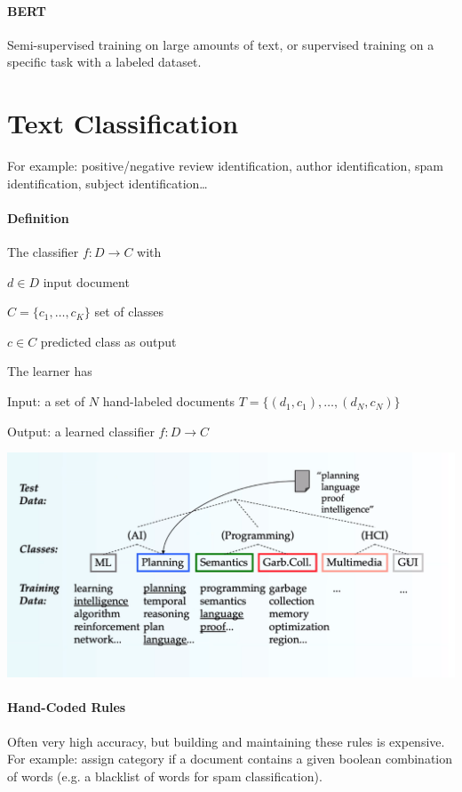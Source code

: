 \documentclass[10pt]{report}
\begin{document}
\paragraph{BERT} Semi-supervised training on large amounts of text, or supervised training on a specific task with a labeled dataset.
\section{Text Classification}
For example: positive/negative review identification, author identification, spam identification, subject identification\ldots
\paragraph{Definition} The classifier $f : D \rightarrow C$ with
\begin{list}{}{}
	\item $d\in D$ input document
	\item $C=\{c_1,\ldots,c_K\}$ set of classes
	\item $c\in C$ predicted class as output
\end{list}
The learner has
\begin{list}{}{}
	\item Input: a set of $N$ hand-labeled documents $T=\{(d_1,c_1),\ldots,(d_N,c_N)\}$
	\item Output: a learned classifier $f:D\rightarrow C$
\end{list}
\begin{center}
	\includegraphics[scale=0.5]{9.png}
\end{center}
\paragraph{Hand-Coded Rules} Often very high accuracy, but building and maintaining these rules is expensive. For example: assign category if a document contains a given boolean combination of words (e.g. a blacklist of words for spam classification).
\end{document}
